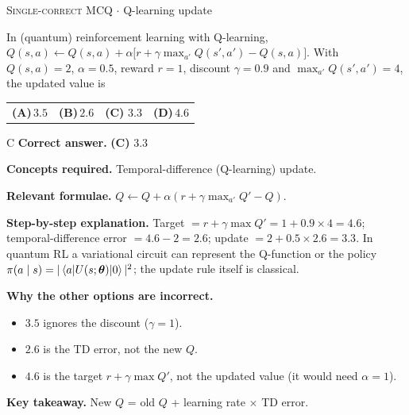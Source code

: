 \documentclass[11pt,a4paper]{article}
\newcommand{\optlabel}[1]{\textbf{(#1)}}
\newcommand{\correctlabel}[1]{\textcolor{okgreen}{\textbf{(#1)}\,\ding{51}}}
\newenvironment{qitem}[1]{\begin{list}{}{\setlength{\leftmargin}{3.3em}\setlength{\labelwidth}{3.1em}%
  \setlength{\labelsep}{0.2em}\setlength{\topsep}{3pt}\setlength{\parsep}{3pt}}\item[\textbf{Q.#1}\hfill]}{\end{list}}
\newcommand{\qsep}{\par\vspace{2pt}{\color{black!15}\hrule}\vspace{4pt}}
\newcommand{\qmeta}[2]{{\footnotesize\color{black!60}\textsc{#1} \;$\cdot$\; #2}\par}
\begin{document}
\begin{qitem}{73}
\qmeta{Single-correct MCQ}{Q-learning update}
In (quantum) reinforcement learning with Q-learning, $Q(s, a) \leftarrow Q(s, a) + \alpha\big[r + \gamma\max_{a'}Q(s', a') - Q(s, a)\big]$.
With $Q(s, a) = 2$, $\alpha = 0.5$, reward $r = 1$, discount $\gamma = 0.9$ and $\max_{a'}Q(s', a') = 4$, the updated value is
\par\smallskip\noindent\begin{tabularx}{\linewidth}{@{}*{4}{L}@{}}
\optlabel{A}\,$3.5$ & \optlabel{B}\,$2.6$ & \correctlabel{C}\,$3.3$ & \optlabel{D}\,$4.6$
\end{tabularx}
\end{qitem}
\begin{solbox}{C}
\textbf{\color{brand}Correct answer.} \textcolor{okgreen}{\textbf{(C)}} $3.3$

\textbf{\color{brand}Concepts required.} Temporal-difference (Q-learning) update.

\textbf{\color{brand}Relevant formulae.} $Q \leftarrow Q + \alpha(r + \gamma\max_{a'}Q' - Q)$.

\textbf{\color{brand}Step-by-step explanation.} Target $= r + \gamma\max Q' = 1 + 0.9\times4 = 4.6$; temporal-difference error $= 4.6 - 2 = 2.6$;
update $= 2 + 0.5\times2.6 = 3.3$. In quantum RL a variational circuit can represent the Q-function or the policy
$\pi(a\mid s) = |\braket{a|U(s; \boldsymbol\theta)|0}|^2$; the update rule itself is classical.

\textbf{\color{brand}Why the other options are incorrect.}
\begin{itemize}[leftmargin=2.4em, itemsep=1pt, topsep=2pt]
\item[\textbf{(A)}] $3.5$ ignores the discount ($\gamma = 1$).
\item[\textbf{(B)}] $2.6$ is the TD error, not the new $Q$.
\item[\textbf{(D)}] $4.6$ is the target $r + \gamma\max Q'$, not the updated value (it would need $\alpha = 1$).
\end{itemize}
\textbf{\color{brand}Key takeaway.} New $Q$ = old $Q$ + learning rate $\times$ TD error.
\end{solbox}
\qsep
\end{document}
